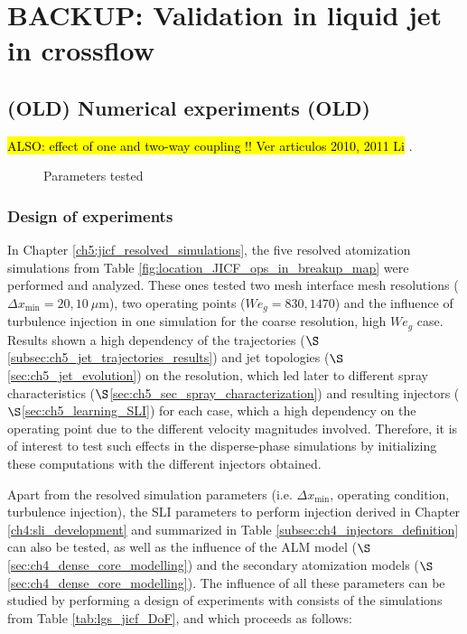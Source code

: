 \chapter{BACKUP: Validation in liquid jet in crossflow}
	\label{ch6:jicf_lgs_simulations}

\section{(OLD) Numerical experiments (OLD)}

\hl{ALSO: effect of one and two-way coupling !! Ver articulos 2010, 2011 Li }.

%
\begin{figure}[h!]	
	\centering
	\caption{Parameters tested}
	\label{fig:dispersed_phase_sli_parameters}
\end{figure}


\subsection{Design of experiments}

In Chapter \ref{ch5:jicf_resolved_simulations}, the five resolved atomization simulations from Table \ref{fig:location_JICF_ops_in_breakup_map} were performed and analyzed. These ones tested two mesh interface mesh resolutions ($\Delta x_\mathrm{min} = 20, 10~\mu$m), two operating points ($We_g = 830, 1470$) and the influence of turbulence injection in one simulation for the coarse resolution, high $We_g$ case. Results shown a high dependency of the trajectories ($\S$\ref{subsec:ch5_jet_trajectories_results}) and jet topologies ($\S$\ref{sec:ch5_jet_evolution}) on the resolution, which led later to different spray characteristics ($\S$\ref{sec:ch5_sec_spray_characterization}) and resulting injectors ($\S$\ref{sec:ch5_learning_SLI}) for each case, which a high dependency on the operating point due to the different velocity magnitudes involved. Therefore, it is of interest to test such effects in the disperse-phase simulations by initializing these computations with the different injectors obtained.

Apart from the resolved simulation parameters (i.e. $\Delta x_\mathrm{min}$, operating condition, turbulence injection), the SLI parameters to perform injection derived in Chapter \ref{ch4:sli_development} and summarized in Table \ref{subsec:ch4_injectors_definition} can also be tested, as well as the influence of the ALM model ($\S$\ref{sec:ch4_dense_core_modelling}) and the secondary atomization models ($\S$\ref{sec:ch4_dense_core_modelling}). The influence of all these parameters can be studied by performing a design of experiments with consists of the simulations from Table \ref{tab:lgs_jicf_DoF}, and which proceeds as follows: 


